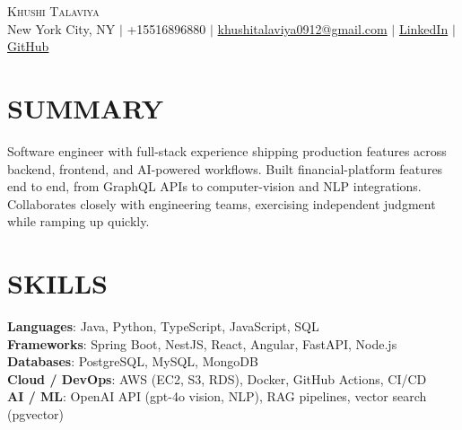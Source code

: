 \documentclass[letterpaper,11pt]{article}
\begin{document}
\begin{center}
    {\Huge \scshape Khushi Talaviya} \\ \vspace{2pt}
    \vspace{4pt}
    \small
    New York City, NY $|$
    \small
    +15516896880 $|$
    \href{mailto:khushitalaviya0912@gmail.com}{khushitalaviya0912@gmail.com} $|$
    \href{https://www.linkedin.com/in/khushitalaviya/}{LinkedIn} $|$
    \href{https://github.com/talaviyakhushi}{GitHub}
\end{center}

\section{SUMMARY}
\vspace{5pt}
\small{Software engineer with full-stack experience shipping production features across backend, frontend, and AI-powered workflows. Built financial-platform features end to end, from GraphQL APIs to computer-vision and NLP integrations. Collaborates closely with engineering teams, exercising independent judgment while ramping up quickly.}

\vspace{2pt}
\section{SKILLS}
\vspace{5pt}
\begin{itemize}[leftmargin=0in, label={}]
\small{\item{
\textbf{Languages}{: Java, Python, TypeScript, JavaScript, SQL} \\
\textbf{Frameworks}{: Spring Boot, NestJS, React, Angular, FastAPI, Node.js} \\
\textbf{Databases}{: PostgreSQL, MySQL, MongoDB} \\
\textbf{Cloud / DevOps}{: AWS (EC2, S3, RDS), Docker, GitHub Actions, CI/CD} \\
\textbf{AI / ML}{: OpenAI API (gpt-4o vision, NLP), RAG pipelines, vector search (pgvector)}
}}
\end{itemize}
\vspace{-10pt}

\end{document}
